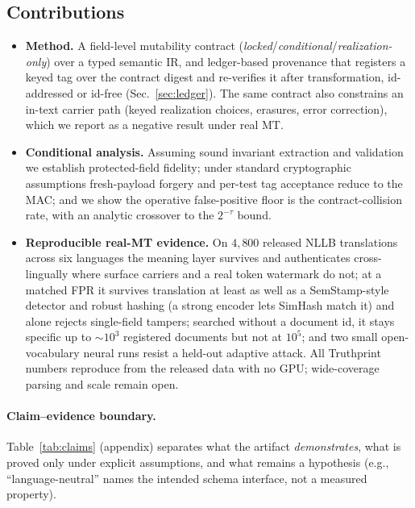 \documentclass[journal]{IEEEtran}
\begin{document}
\subsection{Contributions}
\begin{itemize}[leftmargin=*]
  \item \textbf{Method.} A field-level mutability contract (\emph{locked}/\emph{conditional}/\emph{realization-only}) over a typed semantic IR, and ledger-based provenance that registers a keyed tag over the contract digest and re-verifies it after transformation, id-addressed or id-free (Sec.~\ref{sec:ledger}). The same contract also constrains an in-text carrier path (keyed realization choices, erasures, error correction), which we report as a negative result under real MT.
  \item \textbf{Conditional analysis.} Assuming sound invariant extraction and validation we establish protected-field fidelity; under standard cryptographic assumptions fresh-payload forgery and per-test tag acceptance reduce to the MAC; and we show the operative false-positive floor is the contract-collision rate, with an analytic crossover to the $2^{-\tau}$ bound.
  \item \textbf{Reproducible real-MT evidence.} On $4{,}800$ released NLLB translations across six languages the meaning layer survives and authenticates cross-lingually where surface carriers and a real token watermark do not; at a matched FPR it survives translation at least as well as a SemStamp-style detector and robust hashing (a strong encoder lets SimHash match it) and alone rejects single-field tampers; searched without a document id, it stays specific up to ${\sim}10^3$ registered documents but not at $10^5$; and two small open-vocabulary neural runs resist a held-out adaptive attack. All Truthprint numbers reproduce from the released data with no GPU; wide-coverage parsing and scale remain open.
\end{itemize}

\paragraph{Claim--evidence boundary.} Table~\ref{tab:claims} (appendix) separates what the artifact \emph{demonstrates}, what is proved only under explicit assumptions, and what remains a hypothesis (e.g., ``language-neutral'' names the intended schema interface, not a measured property).
\end{document}
